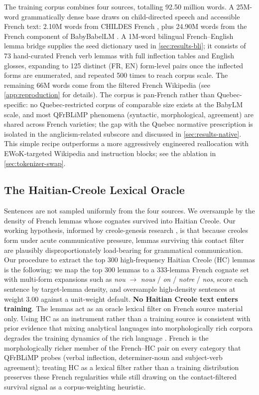 \documentclass[11pt]{article}
\begin{document}
The training corpus combines four sources, totalling 92.50 million words.
A 25M-word grammatically dense base draws on child-directed speech and accessible French text: 2.10M words from CHILDES French \citep{macwhinney2000childes}, plus 24.90M words from the French component of BabyBabelLM \citep{jumelet2026babelm}.
A 1M-word bilingual French--English lemma bridge supplies the seed dictionary used in \autoref{sec:results-bli}; it consists of 73 hand-curated French verb lemmas with full inflection tables and English glosses, expanding to 125 distinct (FR, EN) form-level pairs once the inflected forms are enumerated, and repeated 500 times to reach corpus scale.
The remaining 66M words come from the filtered French Wikipedia (see \autoref{app:reproduction} for details).
The corpus is pan-French rather than Quebec-specific: no Quebec-restricted corpus of comparable size exists at the BabyLM scale, and most QFrBLiMP phenomena (syntactic, morphological, agreement) are shared across French varieties; the gap with the Quebec normative prescription is isolated in the anglicism-related subscore and discussed in \autoref{sec:results-native}.
This simple recipe outperforms a more aggressively engineered reallocation with EWoK-targeted Wikipedia and instruction blocks; see the ablation in \autoref{sec:tokenizer-swap}.

\subsection{The Haitian-Creole Lexical Oracle}
\label{sec:oracle}
Sentences are not sampled uniformly from the four sources. We oversample by the density of French lemmas whose cognates survived into Haitian Creole. Our working hypothesis, informed by creole-genesis research \citep{lefebvre1998creole,mufwene2001ecology}, is that because creoles form under acute communicative pressure, lemmas surviving this contact filter are plausibly disproportionately load-bearing for grammatical communication.
Our procedure to extract the top 300 high-frequency Haitian Creole (HC) lemmas is the following: we map the top 300 lemmas to a 333-lemma French cognate set with multi-form expansions such as \emph{nou} $\to$ \emph{nous} / \emph{on} / \emph{notre} / \emph{nos}, score each sentence by target-lemma density, and oversample high-density sentences at weight 3.00 against a unit-weight default.
\textbf{No Haitian Creole text enters training}. 
The lemmas act as an oracle lexical filter on French source material only. Using HC as an instrument rather than a training source is consistent with prior evidence that mixing analytical languages into morphologically rich corpora degrades the training dynamics of the rich language \citep{wasserman2026scaling}.
French is the morphologically richer member of the French--HC pair on every category that QFrBLiMP probes (verbal inflection, determiner-noun and subject-verb agreement); treating HC as a lexical filter rather than a training distribution preserves these French regularities while still drawing on the contact-filtered survival signal as a corpus-weighting heuristic.
\end{document}
